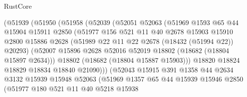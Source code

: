 \begin{lexlean}{RustCore}
\begin{coremodule}
                      (@51939
                        (@51950
                          (@51958
                            (@52039
                              (@52051
                                @52063
                                (@51969
                                  @1593
                                  @65
                                  @44
                                  @15904
                                  @15911
                                  @2850
                                  (@51977
                                    @156
                                    @521
                                    @11
                                    @40
                                    @2678
                                    @15903
                                    @15910
                                    @2800
                                    @15886
                                    @2628
                                    (@51989 @22 @11 @22 @2678 (@18432 (@51994 @22)) @20293)
                                    (@52007
                                      @15896
                                      @2628
                                      @52016
                                      @52019
                                      @18802
                                      (@18682 (@18804 @15897 @2634)))
                                    @18802
                                    (@18682 (@18804 @15887 @15903)))
                                  @18820
                                  @18824
                                  @18829
                                  @18834
                                  @18840
                                  @21090)))
                            (@52043
                              @15915
                              @391
                              @1358
                              @44
                              @2634
                              @3132
                              @15939
                              @15948
                              @52063
                              (@51969
                                @1357
                                @65
                                @44
                                @15939
                                @15946
                                @2850
                                (@51977
                                  @180
                                  @521
                                  @11
                                  @40
                                  @5218
                                  @15938

\end{coremodule}
\end{lexlean}
